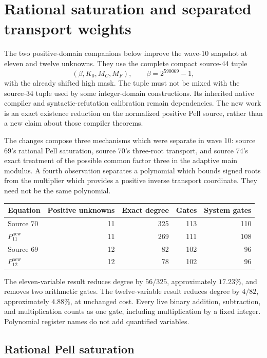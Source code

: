 \section{Rational saturation and separated transport weights}
\label{sec:positive-new}

The two positive-domain companions below improve the wave-10 snapshot at
eleven and twelve unknowns. They use the complete compact source-44 tuple
\[
 (\beta,K_0,M_C,M_F),\qquad \beta=2^{590069}-1,
\]
with the already shifted high mask. The tuple must not be mixed with the
source-34 tuple used by some integer-domain constructions. Its inherited
native compiler and syntactic-refutation calibration remain dependencies.
The new work is an exact existence reduction on the normalized positive
Pell source, rather than a new claim about those compiler theorems.

The changes compose three mechanisms which were separate in wave 10:
source 69's rational Pell saturation, source 70's three-root transport,
and source 74's exact treatment of the possible common factor three in
the adaptive main modulus. A fourth observation separates a polynomial
which bounds signed roots from the multiplier which provides a positive
inverse transport coordinate. They need not be the same polynomial.

\begin{center}
\begin{tabular}{lrrrr}
\hline
Equation & Positive unknowns & Exact degree & Gates & System gates\\
\hline
Source 70 & 11 & 325 & 113 & 110\\
$P_{11}^{\mathrm{new}}$ & 11 & 269 & 111 & 108\\
Source 69 & 12 & 82 & 102 & 96\\
$P_{12}^{\mathrm{new}}$ & 12 & 78 & 102 & 96\\
\hline
\end{tabular}
\end{center}
The eleven-variable result reduces degree by $56/325$, approximately
$17.23\%$, and removes two arithmetic gates. The twelve-variable result
reduces degree by $4/82$, approximately $4.88\%$, at unchanged cost.
Every live binary addition, subtraction, and multiplication counts as one
gate, including multiplication by a fixed integer. Polynomial register
names do not add quantified variables.

\subsection{Rational Pell saturation}

